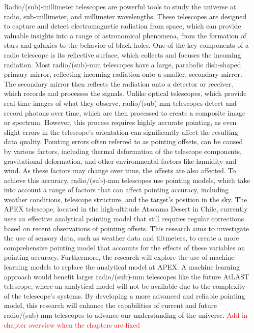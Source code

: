 Radio/(sub)-millimeter telescopes are powerful tools to study the universe at radio, sub-millimeter, and millimeter wavelengths.
These telescopes are designed to capture and detect electromagnetic radiation from space, which can provide valuable insights into a range of astronomical phenomena,
from the formation of stars and galaxies to the behavior of black holes.
One of the key components of a radio telescope is its reflective surface, which collects and focuses the incoming radiation.
Most radio/(sub)-mm telescopes have a large, parabolic dish-shaped primary mirror, reflecting incoming radiation onto a smaller, secondary mirror.
The secondary mirror then reflects the radiation onto a detector or receiver, which records and processes the signals.
Unlike optical telescopes, which provide real-time images of what they observe, radio/(sub)-mm telescopes detect and record photons over time,
which are then processed to create a composite image or spectrum.
However, this process requires highly accurate pointing, as even slight errors in the telescope's orientation can significantly affect the resulting data quality.
Pointing errors often referred to as pointing offsets, can be caused by various factors, including thermal deformation of the telescope components,
gravitational deformation, and other environmental factors like humidity and wind. As these factors may change over time, the offsets are also affected.
To achieve this accuracy, radio/(sub)-mm telescopes use pointing models, which take into account a range of factors that can affect pointing accuracy,
including weather conditions, telescope structure, and the target's position in the sky.
The APEX telescope, located in the high-altitude Atacama Desert in Chile,
currently uses an effective analytical pointing model that still requires regular corrections based on recent observations of pointing offsets.
This research aims to investigate the use of sensory data, such as weather data and tiltmeters,
to create a more comprehensive pointing model that accounts for the effects of these variables on pointing accuracy.
Furthermore, the research will explore the use of machine learning models to replace the analytical model at APEX.
A machine learning approach would benefit larger radio/(sub)-mm telescopes like the future AtLAST telescope, where an analytical model will not be available due to the complexity of the telescope's systems.
By developing a more advanced and reliable pointing model, this research will enhance the capabilities of current and future radio/(sub)-mm telescopes to advance our understanding of the universe.
\textcolor{red}{Add in chapter overview when the chapters are fixed}